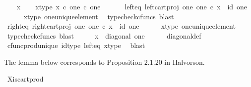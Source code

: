 \begin{isabellebody}
\ \ \isamarkupfalse%
\ x\isanewline
\ \ \isamarkupfalse%
\ x{\isacharunderscore}{\kern0pt}type{\isacharcolon}{\kern0pt}\ {\isachardoublequoteopen}x\ {\isasymin}\isactrlsub c\ one\ {\isasymtimes}\isactrlsub c\ one{\isachardoublequoteclose}\isanewline
\ \ \isanewline
\ \ \isamarkupfalse%
\ left{\isacharunderscore}{\kern0pt}eq{\isacharcolon}{\kern0pt}\ {\isachardoublequoteopen}left{\isacharunderscore}{\kern0pt}cart{\isacharunderscore}{\kern0pt}proj\ one\ one\ {\isasymcirc}\isactrlsub c\ x\ {\isacharequal}{\kern0pt}\ id\ one{\isachardoublequoteclose}\isanewline
\ \ \ \ \isamarkupfalse%
\ x{\isacharunderscore}{\kern0pt}type\ one{\isacharunderscore}{\kern0pt}unique{\isacharunderscore}{\kern0pt}element\ \isamarkupfalse%
\ {\isacharparenleft}{\kern0pt}typecheck{\isacharunderscore}{\kern0pt}cfuncs{\isacharcomma}{\kern0pt}\ blast{\isacharparenright}{\kern0pt}\isanewline
\ \ \isamarkupfalse%
\ right{\isacharunderscore}{\kern0pt}eq{\isacharcolon}{\kern0pt}\ {\isachardoublequoteopen}right{\isacharunderscore}{\kern0pt}cart{\isacharunderscore}{\kern0pt}proj\ one\ one\ {\isasymcirc}\isactrlsub c\ x\ {\isacharequal}{\kern0pt}\ id\ one{\isachardoublequoteclose}\isanewline
\ \ \ \ \isamarkupfalse%
\ x{\isacharunderscore}{\kern0pt}type\ one{\isacharunderscore}{\kern0pt}unique{\isacharunderscore}{\kern0pt}element\ \isamarkupfalse%
\ {\isacharparenleft}{\kern0pt}typecheck{\isacharunderscore}{\kern0pt}cfuncs{\isacharcomma}{\kern0pt}\ blast{\isacharparenright}{\kern0pt}\isanewline
\isanewline
\ \ \isamarkupfalse%
\ \isamarkupfalse%
\ {\isachardoublequoteopen}x\ {\isacharequal}{\kern0pt}\ diagonal\ one{\isachardoublequoteclose}\isanewline
\ \ \ \ \isamarkupfalse%
\ diagonal{\isacharunderscore}{\kern0pt}def\ \isamarkupfalse%
\ cfunc{\isacharunderscore}{\kern0pt}prod{\isacharunderscore}{\kern0pt}unique\ id{\isacharunderscore}{\kern0pt}type\ left{\isacharunderscore}{\kern0pt}eq\ x{\isacharunderscore}{\kern0pt}type\ \isamarkupfalse%
\ blast\isanewline
{}\isamarkupfalse%
%
\endisatagproof
{\isafoldproof}%
%
\isadelimproof
%
\endisadelimproof
%
\begin{isamarkuptext}%
The lemma below corresponds to Proposition 2.1.20 in Halvorson.%
\end{isamarkuptext}\isamarkuptrue%
\isamarkupfalse%
\ X{\isacharunderscore}{\kern0pt}is{\isacharunderscore}{\kern0pt}cart{\isacharunderscore}{\kern0pt}prod{}{\isacharcolon}{\kern0pt}\isanewline

\end{isabellebody}
